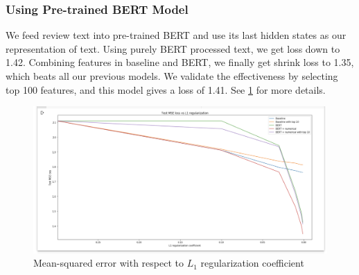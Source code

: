 \documentclass{article}
\begin{document}
\subsubsection{Using Pre-trained BERT Model}
 We feed review text into pre-trained BERT and use its last hidden states as our representation of text. Using purely BERT processed text, we get loss down to 1.42. Combining features in baseline and BERT, we finally get shrink loss to 1.35, which beats all our previous models. We validate the effectiveness by selecting top 100 features, and this model gives a loss of 1.41. See \ref{fig2} for more details.
\begin{figure}
\label{fig2}
\begin{center}
\includegraphics[scale=0.3]{mse_loss_vs_l1}
\caption{Mean-squared error with respect to $L_1$ regularization coefficient}
\end{center}
\end{figure}
\end{document}
